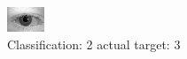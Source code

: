 \begin{figure}[h!]
\begin{center}
\includegraphics[width=0.60\columnwidth]{figures/ID611_class_2_target_3.png}
\end{center}
\caption{ Classification: 2 actual target: 3}
\label{fig:ID611_class_2_target_3}
\end{figure}
